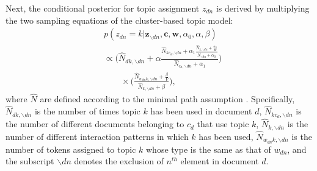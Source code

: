 \documentclass{article}
\begin{document}
Next, the conditional posterior for topic assignment $z_{dn}$ is derived by multiplying the two sampling equations of the cluster-based topic model:
\begin{equation}
	\begin{aligned}
		&p(z_{dn}=k| \boldsymbol{z}_{\backslash dn}, \boldsymbol{c}, \boldsymbol{w}, \alpha_0, \alpha, \beta)\\
		&\propto 
		\Big(\hat N_{dk, \backslash dn}+\alpha \frac{\hat N_{kc_d,\backslash dn}+\alpha_1\frac{\hat N_{k, \backslash dn}+\frac{\alpha_0}{K}}{\hat N_{\backslash dn}+\alpha_0}}{\hat N_{c_d, \backslash dn}+\alpha_1}	\Big)\\&\quad\quad\times \Big(\frac{\hat N_{w_{dn}k, \backslash dn}+\frac{\beta}{V}}{\hat N_{k, \backslash dn}+\beta}	\Big),
	\end{aligned}
\end{equation}
where $\hat N$ are defined according to the minimal path assumption \cite{wallach2008structured}.
Specifically, $\hat N_{dk, \backslash dn}$ is the number of times topic $k$ has been used in document $d$, $\hat N_{kc_d, \backslash dn}$ is the number of different documents belonging to $c_d$ that use topic $k$, $\hat N_{k, \backslash dn}$ is the number of different interaction patterns in which $k$ has been used, $\hat N_{w_{dn}k, \backslash dn}$ is the number of tokens assigned to topic $k$ whose type is the same as that of $w_{dn}$, and the subscript $\backslash dn$ denotes the exclusion of $n^{th}$ element in document $d$. 
\end{document}
